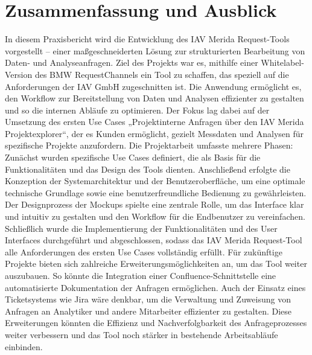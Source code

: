 \chapter{Zusammenfassung und Ausblick}
In diesem Praxisbericht wird die Entwicklung des IAV Merida Request-Tools vorgestellt – einer maßgeschneiderten Lösung zur strukturierten Bearbeitung von Daten- und Analyseanfragen. Ziel des Projekts war es, mithilfe einer Whitelabel-Version des BMW RequestChannels ein Tool zu schaffen, das speziell auf die Anforderungen der IAV GmbH zugeschnitten ist. Die Anwendung ermöglicht es, den Workflow zur Bereitstellung von Daten und Analysen effizienter zu gestalten und so die internen Abläufe zu optimieren. Der Fokus lag dabei auf der Umsetzung des ersten Use Cases „Projektinterne Anfragen über den IAV Merida Projektexplorer“, der es Kunden ermöglicht, gezielt Messdaten und Analysen für spezifische Projekte anzufordern.
\newline
Die Projektarbeit umfasste mehrere Phasen: Zunächst wurden spezifische Use Cases definiert, die als Basis für die Funktionalitäten und das Design des Tools dienten. Anschließend erfolgte die Konzeption der Systemarchitektur und der Benutzeroberfläche, um eine optimale technische Grundlage sowie eine benutzerfreundliche Bedienung zu gewährleisten. Der Designprozess der Mockups spielte eine zentrale Rolle, um das Interface klar und intuitiv zu gestalten und den Workflow für die Endbenutzer zu vereinfachen. Schließlich wurde die Implementierung der Funktionalitäten und des User Interfaces durchgeführt und abgeschlossen, sodass das IAV Merida Request-Tool alle Anforderungen des ersten Use Cases vollständig erfüllt.
\newline
Für zukünftige Projekte bieten sich zahlreiche Erweiterungsmöglichkeiten an, um das Tool weiter auszubauen. So könnte die Integration einer Confluence-Schnittstelle eine automatisierte Dokumentation der Anfragen ermöglichen. Auch der Einsatz eines Ticketsystems wie Jira wäre denkbar, um die Verwaltung und Zuweisung von Anfragen an Analytiker und andere Mitarbeiter effizienter zu gestalten. Diese Erweiterungen könnten die Effizienz und Nachverfolgbarkeit des Anfrageprozesses weiter verbessern und das Tool noch stärker in bestehende Arbeitsabläufe einbinden.